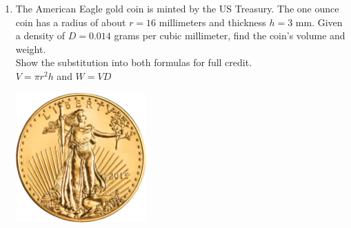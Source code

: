 \begin{enumerate}
\item The American Eagle gold coin is minted by the US Treasury. The one ounce coin has a radius of about $r=16$ millimeters and thickness $h=3$ mm. Given a density of $D = 0.014$ grams per cubic millimeter, find the coin's volume and weight. \\[0.25cm]
  Show the substitution into both formulas for full credit.\\[0.5cm]
  $\displaystyle V = \pi r^2 h$ and $W=VD$
    \begin{flushright}
      \includegraphics[width=5cm]{../graphics/04bcoin.png}
    \end{flushright}

\end{enumerate}
